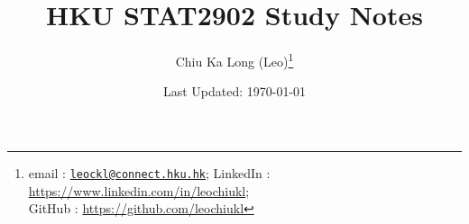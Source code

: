 \documentclass{article}
\begin{document}
\title{HKU STAT2902 Study Notes}
\author{Chiu Ka Long (Leo)\thanks{email :
\href{mailto:leockl@connect.hku.hk}{\texttt{leockl@connect.hku.hk}};
LinkedIn :
\url{https://www.linkedin.com/in/leochiukl}; \\ GitHub :
\url{https://github.com/leochiukl}
}}
\date{Last Updated: \today}
\maketitle
\doclicenseThis
\nocite{*}
\tableofcontents



\printbibliography

\end{document}
